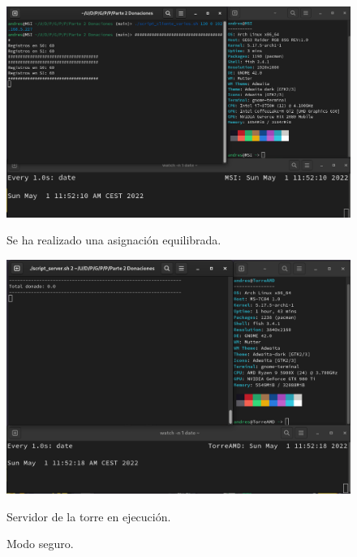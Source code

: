 \documentclass{article}
\begin{document}
\begin{figure}[H]
    \centering
    \begin{minipage}[H]{0.49\textwidth}
        \centering
        \includegraphics[width=\textwidth]{imagenes/multiples ordenadores/Cliente/Screenshot from 2022-05-01 11-52-21.png}
        \caption{Se ha realizado una asignación equilibrada.}
    \end{minipage}
    \hfill
    \begin{minipage}[H]{0.49\textwidth}
        \centering
        \includegraphics[width=\textwidth]{imagenes/multiples ordenadores/Servidor/Screenshot from 2022-05-01 11-52-21.png}
        \caption{Servidor de la torre en ejecución.}
    \end{minipage}
    \caption{Modo seguro.}
\end{figure}
\end{document}
